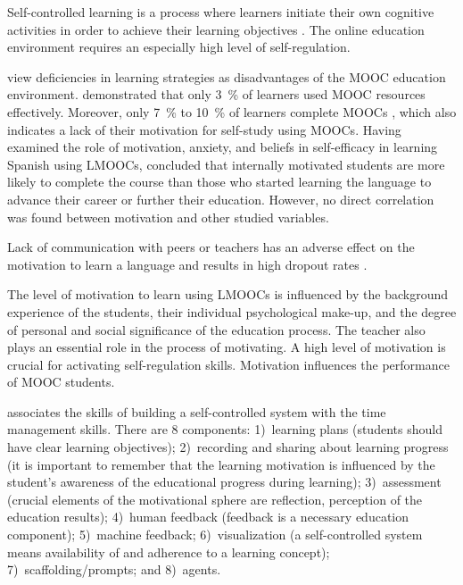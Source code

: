 \documentclass[english]{textolivre}
\begin{document}
Self-controlled learning is a process where learners initiate their own cognitive activities in order to achieve their learning objectives \cite{zimmerman_social_1989}. The online education environment requires an especially high level of self-regulation.

\textcite{winne_self-regulating_2003} view deficiencies in learning strategies as disadvantages of the MOOC education environment. \textcite{lust_regulation_2013} demonstrated that only 3 \% of learners used MOOC resources effectively. Moreover, only 7 \% to 10 \% of learners complete MOOCs \cite{daniel_making_2012}, which also indicates a lack of their motivation for self-study using MOOCs. Having examined the role of motivation, anxiety, and beliefs in self-efficacy in learning Spanish using LMOOCs, \textcite{barkanyi_motivation_2021} concluded that internally motivated students are more likely to complete the course than those who started learning the language to advance their career or further their education. However, no direct correlation was found between motivation and other studied variables.

Lack of communication with peers or teachers has an adverse effect on the motivation to learn a language and results in high dropout rates \cite{khalil_moocs_2014}.

The level of motivation to learn using LMOOCs is influenced by the background experience of the students, their individual psychological make-up, and the degree of personal and social significance of the education process. The teacher also plays an essential role in the process of motivating. A high level of motivation is crucial for activating self-regulation skills. Motivation influences the performance of MOOC students.

\textcite{yen_framework_2018} associates the skills of building a self-controlled system with the time management skills. There are 8 components: 1) learning plans (students should have clear learning objectives); 2) recording and sharing about learning progress (it is important to remember that the learning motivation is influenced by the student’s awareness of the educational progress during learning); 3) assessment (crucial elements of the motivational sphere are reflection, perception of the education results); 4) human feedback (feedback is a necessary education component); 5) machine feedback; 6) visualization (a self-controlled system means availability of and adherence to a learning concept); 7) scaffolding/prompts; and 8) agents.
\end{document}
